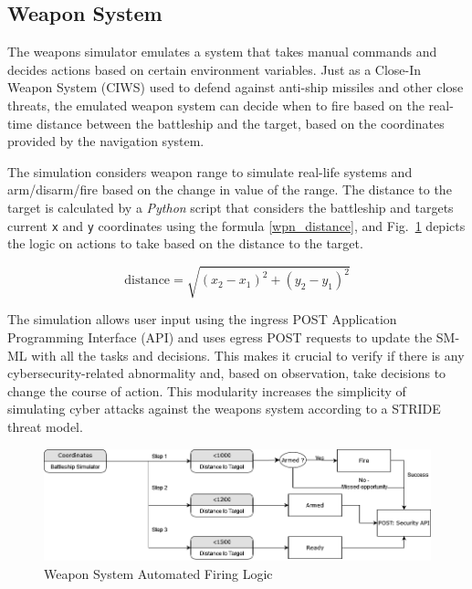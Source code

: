 \documentclass[conference]{IEEEtran}
\begin{document}
\subsection{Weapon System}
The weapons simulator emulates a system that takes manual commands and decides actions based on certain environment variables. Just as a Close-In Weapon System (CIWS) used to defend against anti-ship missiles and other close threats, the emulated weapon system can decide when to fire based on the real-time distance between the battleship and the target, based on the coordinates provided by the navigation system.  

The simulation considers weapon range to simulate real-life systems and arm/disarm/fire based on the change in value of the range. The distance to the target is calculated by a \textit{Python} script that considers the battleship and targets current \texttt{x} and \texttt{y} coordinates using the formula \eqref{wpn_distance}, and Fig.~\ref{WPNlogic} depicts the logic on actions to take based on the distance to the target.

\begin{equation}
\text{distance} = \sqrt{(x_2 - x_1)^2 + (y_2 - y_1)^2}  
\label{wpn_distance}
\end{equation}

The simulation allows user input using the ingress POST Application Programming Interface (API) and uses egress POST requests to update the SM-ML with all the tasks and decisions. This makes it crucial to verify if there is any cybersecurity-related abnormality and, based on observation, take decisions to change the course of action. This modularity increases the simplicity of simulating cyber attacks against the weapons system according to a STRIDE threat model.

\begin{figure}
    \centerline{\includegraphics[width=1\linewidth]{firinglogic.png}}
    \caption{Weapon System Automated Firing Logic}
    \label{WPNlogic}
    
\end{figure}

\end{document}
